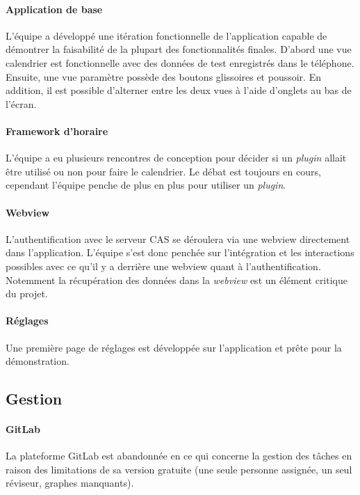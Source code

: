 	\paragraph{Application de base} L'équipe a développé une itération fonctionnelle de l'application capable de démontrer la faisabilité de la plupart des fonctionnalités finales. D'abord une vue calendrier est fonctionnelle avec des données de test enregistrés dans le téléphone. Ensuite, une vue paramètre possède des boutons glissoires et poussoir. En addition, il est possible d'alterner entre les deux vues à l'aide d'onglets au bas de l'écran.
	
	\paragraph{Framework d'horaire} L'équipe a eu plusieurs rencontres de conception pour décider si un \emph{plugin} allait être utilisé ou non pour faire le calendrier. Le débat est toujours en cours, cependant l'équipe penche de plus en plus pour utiliser un \emph{plugin}.


	\paragraph{Webview} L'authentification avec le serveur CAS se déroulera via une webview directement dans l'application. L'équipe s'est donc penchée sur l'intégration et les interactions possibles avec ce qu'il y a derrière une webview quant à l'authentification. Notemment la récupération des données dans la \emph{webview} est un élément critique du projet.
	
	\paragraph{Réglages} Une première page de réglages est développée sur l'application et prête pour la démonstration.
	
	\subsection{Gestion}

	\paragraph{GitLab} La plateforme GitLab est abandonnée en ce qui concerne la gestion des tâches en raison des limitations de sa version gratuite (une seule personne assignée, un seul réviseur, graphes manquants).
	
